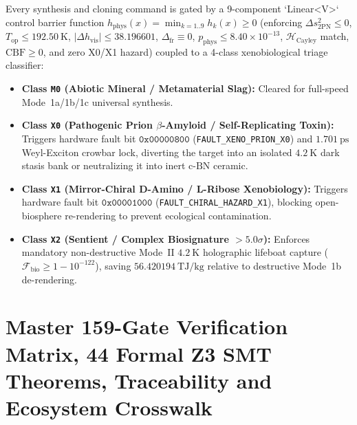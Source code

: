 \documentclass[11pt,onecolumn]{article}
\begin{document}
\begin{enumerate}
    Every synthesis and cloning command is gated by a 9-component `Linear<V>` control barrier function $h_{\text{phys}}(x) = \min_{k=1..9} h_k(x) \ge 0$ (enforcing $\Delta s^2_{\text{2PN}} \le 0$, $T_{\text{op}} \le 192.50~\text{K}$, $|\Delta h_{\text{vis}}| \le 38.196601$, $\Delta_{\text{fr}} \equiv 0$, $p_{\text{phys}} \le 8.40\times 10^{-13}$, $\mathcal{H}_{\text{Cayley}}$ match, $\text{CBF} \ge 0$, and zero X0/X1 hazard) coupled to a 4-class xenobiological triage classifier:
    \begin{itemize}
        \item \textbf{Class \texttt{M0} (Abiotic Mineral / Metamaterial Slag):} Cleared for full-speed Mode~1a/1b/1c universal synthesis.
        \item \textbf{Class \texttt{X0} (Pathogenic Prion $\beta$-Amyloid / Self-Replicating Toxin):} Triggers hardware fault bit $\texttt{0x00000800}$ (\texttt{FAULT\_XENO\_PRION\_X0}) and $1.701~\text{ps}$ Weyl-Exciton crowbar lock, diverting the target into an isolated $4.2~\text{K}$ dark stasis bank or neutralizing it into inert $\text{c-BN}$ ceramic.
        \item \textbf{Class \texttt{X1} (Mirror-Chiral D-Amino / L-Ribose Xenobiology):} Triggers hardware fault bit $\texttt{0x00001000}$ (\texttt{FAULT\_CHIRAL\_HAZARD\_X1}), blocking open-biosphere re-rendering to prevent ecological contamination.
        \item \textbf{Class \texttt{X2} (Sentient / Complex Biosignature $> 5.0\sigma$):} Enforces mandatory non-destructive Mode~II $4.2~\text{K}$ holographic lifeboat capture ($\mathcal{F}_{\text{bio}} \ge 1 - 10^{-122}$), saving $56.420194~\text{TJ/kg}$ relative to destructive Mode~1b de-rendering.
    \end{itemize}
\end{enumerate}

\FloatBarrier
\section[Master 159-Gate Matrix, 44 Z3 Proofs and Ecosystem Crosswalk]{Master 159-Gate Verification Matrix, 44 Formal Z3 SMT Theorems, Traceability and Ecosystem Crosswalk}
\label{sec:matrix}

\FloatBarrier
\end{document}
